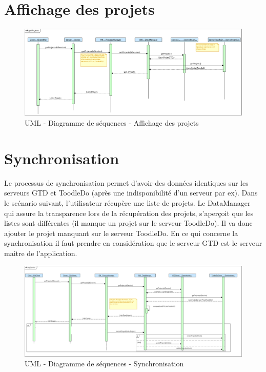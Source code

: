 \section{Affichage des projets}


\begin{figure}[H]
  \begin{center}
  \includegraphics[scale=0.25,angle=90]{livrable3/images/display.png}
  \caption{UML - Diagramme de séquences - Affichage des projets}
  \end{center}
\end{figure}



\section{Synchronisation}

Le processus de synchronisation permet d'avoir des données identiques sur les serveurs GTD et ToodleDo (après une indisponibilité d'un serveur par ex). Dans le scénario suivant, l'utilisateur récupère une liste de projets. Le DataManager qui assure la transparence lors de la récupération des projets, s'aperçoit que les listes sont différentes (il manque un projet sur le serveur ToodleDo). Il va donc ajouter le projet manquant sur le serveur ToodleDo. En ce qui concerne la synchronisation il faut prendre en considération que le serveur GTD est le serveur maitre de l'application. 

\begin{figure}[H]
  \begin{center}
  \includegraphics[scale=0.25,angle=90]{livrable3/images/synchro.png}
  \caption{UML - Diagramme de séquences - Synchronisation}
  \end{center}
\end{figure}

